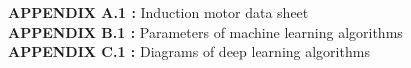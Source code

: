\singlespacing

\textbf{APPENDIX A.1 :} Induction motor data sheet\\
\textbf{APPENDIX B.1 :} Parameters of machine learning algorithms\\
\textbf{APPENDIX C.1 :} Diagrams of deep learning algorithms\\





\newpage
